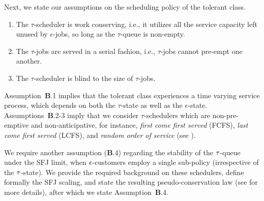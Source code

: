  


 Next, we state our assumptions on the
scheduling policy of the tolerant class.
\begin{enumerate}[{\bf B}.1]
\item The $\tau$-scheduler is work conserving, i.e., it utilizes all
  the service capacity left unused by $\epsilon$-jobs, so long as the
  $\tau$-queue is non-empty.
\item The $\tau$-jobs are served in a serial fashion, i.e.,
  $\tau$-jobs cannot pre-empt one another.
\item The $\tau$-scheduler is blind to the size of $\tau$-jobs.
\end{enumerate}

Assumption~{\bf B}.1 implies that the tolerant class experiences a
time varying service process, which depends on both the $\tau$-state
as well as the $\epsilon$-state. Assumptions~\textbf{B}.2-3 imply that
we consider $\tau$-schedulers which are non-pre-emptive and
non-anticipative, for instance, {\it first come first served} (FCFS),
{\it last come first served} (LCFS), and {\it random order of service}
(see
\cite[Chapter~29]{Harchol-Balter}). %

We require another assumption ({\bf B}.4) regarding the stability of
the ${\tau}$-queue under the SFJ limit, when ${ \epsilon }$-customers employ a
single sub-policy (irrespective of the ${\tau}$-state).
We provide the required background on these schedulers, define
formally the SFJ scaling, and state the resulting pseudo-conservation
law (see \cite{ANOR} for more details), after which we state
Assumption~{\bf B}.4.


